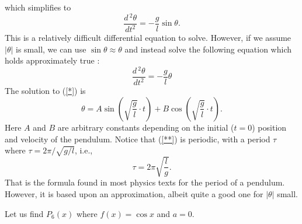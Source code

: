 which simplifies to 
\begin{equation}
\frac{d\,^2\theta}{dt^2}=-\frac{g}l\sin\theta.\label{pendeqtn}
\end{equation}
This is a relatively difficult differential equation to solve.
However, if we assume $|\theta|$ is small, we can use
$\sin\theta\approx\theta$
and instead solve the following equation which holds approximately true
\footnotemark
{}:
\begin{equation}\frac{d\,^2\theta}{dt^2}
=-\frac{g}l\theta\label{*}\end{equation}
The solution to (\ref{*}) is 
\begin{equation}\theta=A\sin\left(\sqrt{\frac{g}l}\cdot t\right)
+B\cos\left(\sqrt{\frac{g}l}\cdot t\right).\label{**}\end{equation}
Here $A$ and $B$ are arbitrary constants depending on the initial
($t=0$) position and velocity of the pendulum.  Notice that
(\ref{**}) is periodic, with a period $\tau$ where 
$\tau=2\pi/\sqrt{g/l}$, i.e.,
\begin{equation}\tau=2\pi\sqrt{\frac{l}g}.\label{period}\end{equation} 
That is the formula found in most physics texts for the period of a 
pendulum.  However, it is based upon an approximation, albeit quite
a good one for $|\theta|$ small.
\eex

 
\bigskip






\bigskip
\bex Let us find $P_6(x)$ where
$f(x)=\cos x$ and $a=0$.
\medskip

